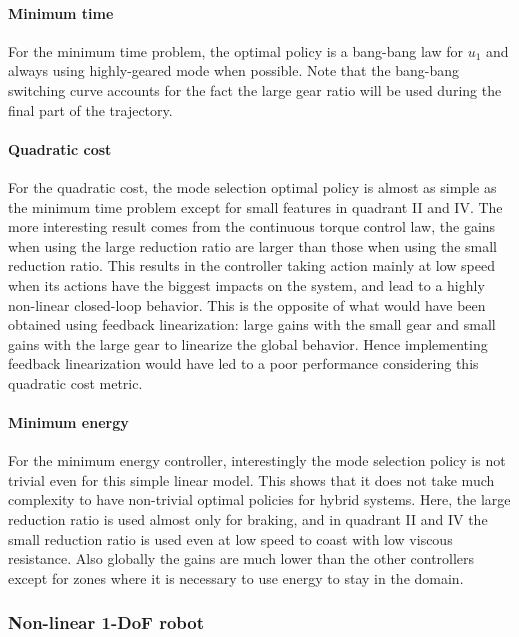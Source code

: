 \paragraph{Minimum time}
\label{sec:MinimumTime}
For the minimum time problem, the optimal policy is a bang-bang law for $u_1$ and always using highly-geared mode when possible. Note that the bang-bang switching curve accounts for the fact the large gear ratio will be used during the final part of the trajectory.

\paragraph{Quadratic cost}
\label{sec:QuadraticCost}
For the quadratic cost, the mode selection optimal policy is almost as simple as the minimum time problem except for small features in quadrant II and IV. The more interesting result comes from the continuous torque control law, the gains when using the large reduction ratio are larger than those when using the small reduction ratio. This results in the controller taking action mainly at low speed when its actions have the biggest impacts on the system, and lead to a highly non-linear closed-loop behavior. This is the opposite of what would have been obtained using feedback linearization: large gains with the small gear and small gains with the large gear to linearize the global behavior. Hence implementing feedback linearization would have led to a poor performance considering this quadratic cost metric. 

\paragraph{Minimum energy}
\label{sec:MinimumEnergy}
For the minimum energy controller, interestingly the mode selection policy is not trivial even for this simple linear model.  This shows that it does not take much complexity to have non-trivial optimal policies for hybrid systems. Here, the large reduction ratio is used almost only for braking, and in quadrant II and IV the small reduction ratio is used even at low speed to coast with low viscous resistance. Also globally the gains are much lower than the other controllers except for zones where it is necessary to use energy to stay in the domain. 

\subsubsection{Non-linear 1-DoF robot}

